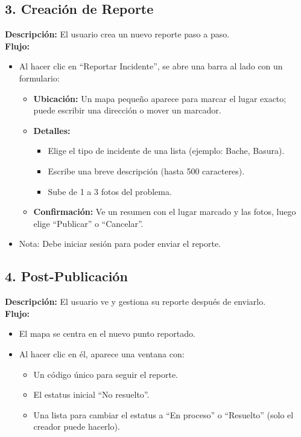 \subsection{3. Creación de Reporte}
\textbf{Descripción:} El usuario crea un nuevo reporte paso a paso.\\
\textbf{Flujo:}
\begin{itemize}
    \item Al hacer clic en ``Reportar Incidente'', se abre una barra al lado con un formulario:
    \begin{itemize}
        \item \textbf{Ubicación:} Un mapa pequeño aparece para marcar el lugar exacto; puede escribir una dirección o mover un marcador.
        \item \textbf{Detalles:} 
        \begin{itemize}
            \item Elige el tipo de incidente de una lista (ejemplo: Bache, Basura).
            \item Escribe una breve descripción (hasta 500 caracteres).
            \item Sube de 1 a 3 fotos del problema.
        \end{itemize}
        \item \textbf{Confirmación:} Ve un resumen con el lugar marcado y las fotos, luego elige ``Publicar'' o ``Cancelar''.
    \end{itemize}
    \item Nota: Debe iniciar sesión para poder enviar el reporte.
\end{itemize}

\subsection{4. Post-Publicación}
\textbf{Descripción:} El usuario ve y gestiona su reporte después de enviarlo.\\
\textbf{Flujo:}
\begin{itemize}
    \item El mapa se centra en el nuevo punto reportado.
    \item Al hacer clic en él, aparece una ventana con:
    \begin{itemize}
        \item Un código único para seguir el reporte.
        \item El estatus inicial ``No resuelto''.
        \item Una lista para cambiar el estatus a ``En proceso'' o ``Resuelto'' (solo el creador puede hacerlo).
    \end{itemize}
\end{itemize}

